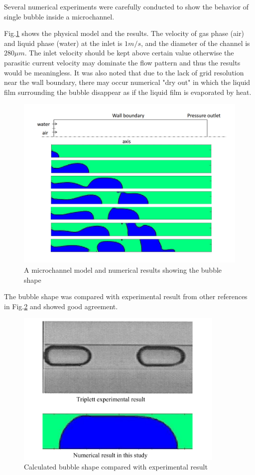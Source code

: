 \documentclass[a4,14pt]{extarticle}
\begin{document}
Several numerical experiments were carefully conducted to
show the behavior of single bubble inside a microchannel.

Fig.\ref{fig:bubble_channel} shows the physical model and the results. The velocity of
gas phase (air) and liquid phase (water) at the inlet is $1 m/s$, and the diameter of the
channel is $280 \mu m$. The inlet velocity should be kept above certain value otherwise the
parasitic current velocity may dominate the flow pattern and thus the results would be
meaningless. It was also noted that due to the lack of grid resolution near the wall boundary,
there may occur numerical "dry out" in which the liquid film surrounding the bubble disappear
as if the liquid film is evaporated by heat.

\begin{figure}[h!]
  \centering
  \includegraphics[width=12cm]{bubble_channel.png}
  \caption{A microchannel model and numerical results showing the bubble shape}
  \label{fig:bubble_channel}
\end{figure}

The bubble shape was compared with experimental result from other references\cite{Triplett1999377}
in Fig.\ref{fig:bubble_shape} and showed good agreement.

\begin{figure}[h!]
  \centering
  \includegraphics[width=10cm]{bubble_shape.png}
  \caption{Calculated bubble shape compared with experimental result}
  \label{fig:bubble_shape}
\end{figure}
\end{document}
